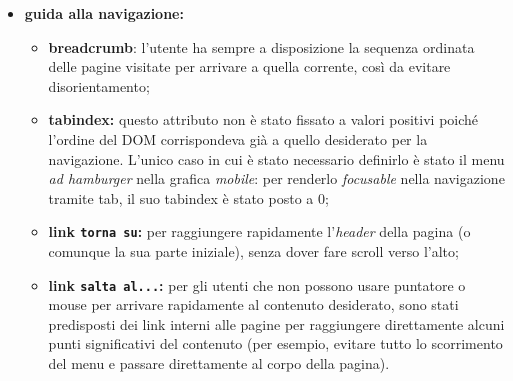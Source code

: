 \begin{itemize}
	\item \textbf{guida alla navigazione:}
	\begin{itemize}
		\item \textbf{breadcrumb}: l'utente ha sempre a disposizione la sequenza ordinata delle pagine visitate per arrivare a quella corrente, così da evitare disorientamento;
		\item \textbf{tabindex:} questo attributo non è stato fissato a valori positivi poiché l'ordine del DOM corrispondeva già a quello desiderato per la navigazione. L'unico caso in cui è stato necessario definirlo è stato il menu \textit{ad hamburger} nella grafica \textit{mobile}: per renderlo \textit{focusable} nella navigazione tramite tab, il suo tabindex è stato posto a 0;
		\item \textbf{link \texttt{torna su}:} per raggiungere rapidamente l'\textit{header} della pagina (o comunque la sua parte iniziale), senza dover fare scroll verso l'alto;
		\item \textbf{link \texttt{salta al...}:} per gli utenti che non possono usare puntatore o mouse per arrivare rapidamente al contenuto desiderato, sono stati predisposti dei link interni alle pagine per raggiungere direttamente alcuni punti significativi del contenuto (per esempio, evitare tutto lo scorrimento del menu e passare direttamente al corpo della pagina).
	\end{itemize}
\end{itemize}
